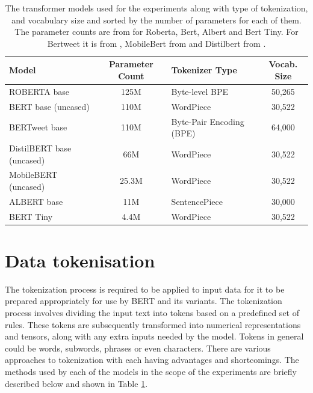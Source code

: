 \begin{table}[ht]
    \captionsetup{font=small}
    \centering
    \begin{tabularx}{\textwidth}{|l|c|X|c|}
        \hline
        \rowcolor[gray]{0.7}
        \textbf{Model}            & \textbf{Parameter Count} & \textbf{Tokenizer Type}  & \textbf{Vocab. Size} \\
        \hline
        ROBERTA base              & 125M                     & Byte-level BPE           & 50,265               \\
        \hline
        BERT base (uncased)       & 110M                     & WordPiece                & 30,522               \\
        \hline
        BERTweet base             & 110M                     & Byte-Pair Encoding (BPE) & 64,000               \\
        \hline
        DistilBERT base (uncased) & 66M                      & WordPiece                & 30,522               \\
        \hline
        MobileBERT (uncased)      & 25.3M                    & WordPiece                & 30,522               \\
        \hline
        ALBERT base               & 11M                      & SentencePiece            & 30,000               \\
        \hline
        BERT Tiny                 & 4.4M                     & WordPiece                & 30,522               \\
        \hline
    \end{tabularx}
    \caption{The transformer models used for the experiments along with type of tokenization, and vocabulary size and sorted by the number of parameters for each of them. The parameter counts are from \cite{bhargavaGeneralizationNLIWays2021} for Roberta, Bert, Albert and Bert Tiny. For Bertweet it is from \cite{nguyenBERTweetPretrainedLanguage2020}, MobileBert from \cite{sunMobileBERTCompactTaskAgnostic2020} and Distilbert from \cite{sanhDistilBERTDistilledVersion2020}.}
    \label{tab: model_dtls}
\end{table}

\section{Data tokenisation}
The tokenization process is required to be applied to input data for it to be prepared appropriately for use by BERT and its variants. The tokenization process involves dividing the input text into tokens based on a predefined set of rules. These tokens are subsequently transformed into numerical representations and tensors, along with any extra inputs needed by the model. Tokens in general could be words, subwords, phrases or even characters. There are various approaches to tokenization with each having advantages and shortcomings. The methods used by each of the models in the scope of the experiments are briefly described below and shown in Table \ref{tab: model_dtls}.

